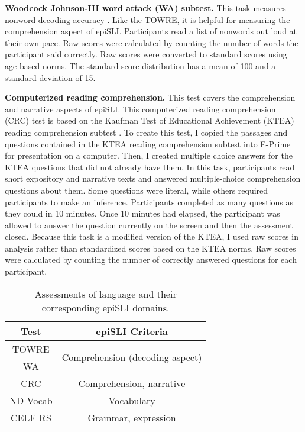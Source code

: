 \documentclass[../dissertation.tex]{subfiles}
\begin{document}
	\textbf{Woodcock Johnson-III word attack (WA) subtest.} This task measures nonword decoding accuracy \citep{Woodcock2001}. Like the TOWRE, it is helpful for measuring the comprehension aspect of epiSLI. Participants read a list of nonwords out loud at their own pace. Raw scores were calculated by counting the number of words the participant said correctly. Raw scores were converted to standard scores using age-based norms. The standard score distribution has a mean of 100 and a standard deviation of 15. \par
	\textbf{Computerized reading comprehension.} This test covers the comprehension and narrative aspects of epiSLI. This computerized reading comprehension (CRC) test is based on the Kaufman Test of Educational Achievement (KTEA) reading comprehension subtest \citep{Kaufman2004}. To create this test, I copied the passages and questions contained in the KTEA reading comprehension subtest into E-Prime \citep{schneider2002prime} for presentation on a computer. Then, I created multiple choice answers for the KTEA questions that did not already have them. In this task, participants read short expository and narrative texts and answered multiple-choice comprehension questions about them. Some questions were literal, while others required participants to make an inference. Participants completed as many questions as they could in 10 minutes. Once 10 minutes had elapsed, the participant was allowed to answer the question currently on the screen and then the assessment closed. Because this task is a modified version of the KTEA, I used raw scores in analysis rather than standardized scores based on the KTEA norms. Raw scores were calculated by counting the number of correctly answered questions for each participant.  \par
	
\begin{wraptable}[8]{R}{0.5\linewidth}
\caption{Assessments of language and their corresponding epiSLI domains.}
\vspace{-10pt}
\begin{center}
\begin{tabular}{ cc } 
 \toprule
 Test & epiSLI Criteria \\ 
 \midrule
 TOWRE & \multirow{2}{*}{Comprehension (decoding aspect)}\\ 
 WA & \\ 
 CRC & Comprehension, narrative \\
 ND Vocab & Vocabulary \\ 
 CELF RS & Grammar, expression \\ 
 \bottomrule 
\end{tabular}
\end{center}
\label{slitable}
\end{wraptable}
\end{document}
